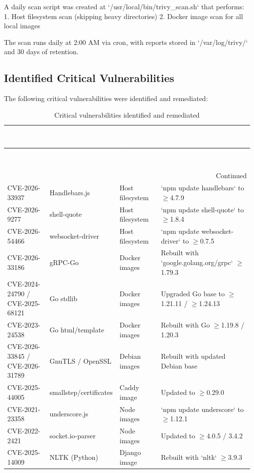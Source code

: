A daily scan script was created at `/usr/local/bin/trivy\_scan.sh` that performs:
1. Host filesystem scan (skipping heavy directories)
2. Docker image scan for all local images

The scan runs daily at 2:00 AM via cron, with reports stored in `/var/log/trivy/` and 30 days of retention.

\subsection{Identified Critical Vulnerabilities}

The following critical vulnerabilities were identified and remediated:

\begin{center}
\begin{longtable}{|p{}|p{}|p{}|p{}|}
\caption[Critical Vulnerabilities]{Critical vulnerabilities identified and remediated}
\label{tab:critical-cves} \\
\hline
\rowcolor{mooveblue}
\textcolor{white}{\textbf{CVE}} & \textcolor{white}{\textbf{Component}} & \textcolor{white}{\textbf{Affected System}} & \textcolor{white}{\textbf{Fix Applied}} \\
\hline
\endfirsthead
\hline
\rowcolor{mooveblue}
\textcolor{white}{\textbf{CVE}} & \textcolor{white}{\textbf{Component}} & \textcolor{white}{\textbf{Affected System}} & \textcolor{white}{\textbf{Fix Applied}} \\
\hline
\endhead
\hline
\multicolumn{4}{|r|}{Continued} \\
\hline
\endfoot
\hline
\endlastfoot
CVE-2026-33937 & Handlebars.js & Host filesystem & `npm update handlebars` to $\ge$4.7.9 \\
CVE-2026-9277 & shell-quote & Host filesystem & `npm update shell-quote` to $\ge$1.8.4 \\
CVE-2026-54466 & websocket-driver & Host filesystem & `npm update websocket-driver` to $\ge$0.7.5 \\
CVE-2026-33186 & gRPC-Go & Docker images & Rebuilt with `google.golang.org/grpc` $\ge$1.79.3 \\
CVE-2024-24790 / CVE-2025-68121 & Go stdlib & Docker images & Upgraded Go base to $\ge$1.21.11 / $\ge$1.24.13 \\
CVE-2023-24538 & Go html/template & Docker images & Rebuilt with Go $\ge$1.19.8 / 1.20.3 \\
CVE-2026-33845 / CVE-2026-31789 & GnuTLS / OpenSSL & Debian images & Rebuilt with updated Debian base \\
CVE-2025-44005 & smallstep/certificates & Caddy image & Updated to $\ge$0.29.0 \\
CVE-2021-23358 & underscore.js & Node images & `npm update underscore` to $\ge$1.12.1 \\
CVE-2022-2421 & socket.io-parser & Node images & Updated to $\ge$4.0.5 / 3.4.2 \\
CVE-2025-14009 & NLTK (Python) & Django image & Rebuilt with `nltk` $\ge$3.9.3 \\
\hline
\end{longtable}
\end{center}

